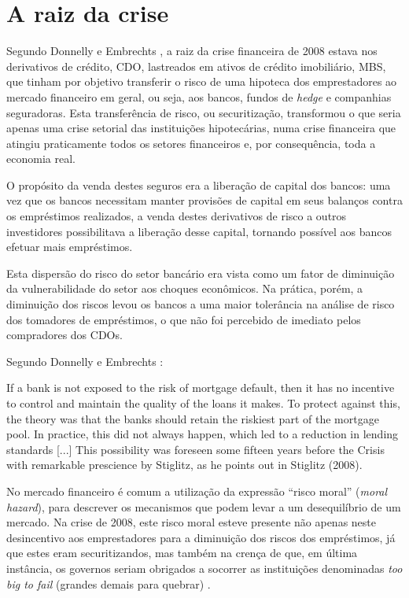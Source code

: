 \documentclass[
	12pt,				%
	oneside,			%
	a4paper,			%
	chapter=TITLE,		%
	section=TITLE,		%
	english,			%
	brazil				%
	]{abntex2}
\begin{document}
\hypertarget{a-raiz-da-crise}{%
\section{A raiz da crise}\label{a-raiz-da-crise}}

Segundo Donnelly e Embrechts \autocite*[3]{devil}, a raiz da crise financeira de 2008
estava nos derivativos de crédito, \gls{CDO}, lastreados em ativos de crédito
imobiliário, \gls{MBS}, que tinham por objetivo transferir o risco de uma
hipoteca dos emprestadores ao mercado financeiro em geral, ou seja, aos bancos,
fundos de \emph{hedge} e companhias seguradoras. Esta transferência de risco, ou
securitização, transformou o que seria apenas uma crise setorial das
instituições hipotecárias, numa crise financeira que atingiu praticamente todos
os setores financeiros e, por consequência, toda a economia real.

O propósito da venda destes seguros era a liberação de capital dos bancos: uma
vez que os bancos necessitam manter provisões de capital em seus balanços contra
os empréstimos realizados, a venda destes derivativos de risco a outros
investidores possibilitava a liberação desse capital, tornando possível aos
bancos efetuar mais empréstimos.

Esta dispersão do risco do setor bancário era vista como um fator de diminuição
da vulnerabilidade do setor aos choques econômicos. Na prática, porém, a
diminuição dos riscos levou os bancos a uma maior tolerância na análise de
risco dos tomadores de empréstimos, o que não foi percebido de imediato pelos
compradores dos \gls{CDO}s.

Segundo Donnelly e Embrechts \autocite*[5]{devil}:
\begin{citacao}
If a bank is not exposed to the risk of mortgage default, then it has no
incentive to control and maintain the quality of the loans it makes. To protect
against this, the theory was that the banks should retain the riskiest part of
the mortgage pool. In practice, this did not always happen, which led to a
reduction in lending standards [...] This possibility was foreseen some fifteen
years before the Crisis with remarkable prescience by Stiglitz, as he points out
in Stiglitz (2008).
\end{citacao}
No mercado financeiro é comum a utilização da expressão ``risco moral'' (\emph{moral
hazard}), para descrever os mecanismos que podem levar a um desequilíbrio de um
mercado. Na crise de 2008, este risco moral esteve presente não apenas neste
desincentivo aos emprestadores para a diminuição dos riscos dos empréstimos, já
que estes eram securitizandos, mas também na crença de que, em última instância,
os governos seriam obrigados a socorrer as instituições denominadas \emph{too big to
fail} (grandes demais para quebrar) \autocite[4-5]{devil}.
\end{document}
